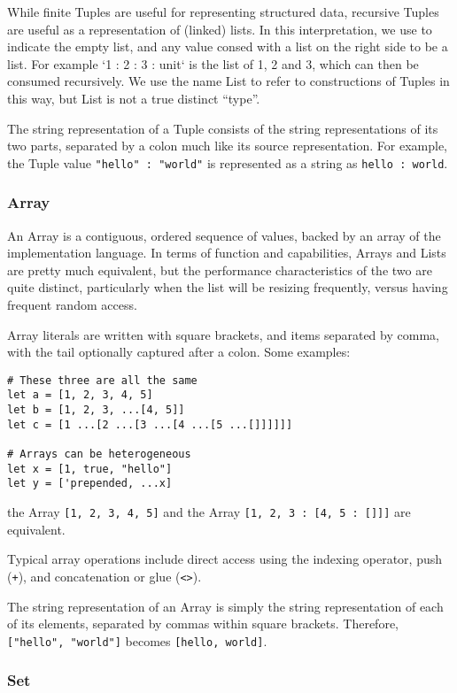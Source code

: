 While finite Tuples are useful for representing structured data, recursive Tuples
are useful as a representation of (linked) lists. In this interpretation, we use
 to indicate the empty list, and any value consed with a list on the
right side to be a list. For example `1 : 2 : 3 : unit` is the list of 1, 2 and 3,
which can then be consumed recursively. We use the name List to refer to constructions
of Tuples in this way, but List is not a true distinct ``type''.

The string representation of a Tuple consists of the string representations of its
two parts, separated by a colon much like its source representation.
For example, the Tuple value \texttt{"hello" : "world"} is represented as a string
as \texttt{hello : world}.

\subsubsection{Array}

An Array is a contiguous, ordered sequence of values, backed by an array of
the implementation language. In terms of function and capabilities, Arrays
and Lists are pretty much equivalent, but the performance characteristics
of the two are quite distinct, particularly when the list will be resizing
frequently, versus having frequent random access.

Array literals are written with square brackets, and items separated by
comma, with the tail optionally captured after a colon. Some examples:

\begin{lstlisting}[language=Trilogy]
# These three are all the same
let a = [1, 2, 3, 4, 5]
let b = [1, 2, 3, ...[4, 5]]
let c = [1 ...[2 ...[3 ...[4 ...[5 ...[]]]]]]

# Arrays can be heterogeneous
let x = [1, true, "hello"]
let y = ['prepended, ...x]
\end{lstlisting}
the Array \texttt{[1, 2, 3, 4, 5]} and the Array \texttt{[1, 2, 3 : [4, 5 : []]]}
are equivalent.

Typical array operations include direct access using the indexing operator,
push (\texttt{+}), and concatenation or glue (\texttt{<>}).

The string representation of an Array is simply the string representation of
each of its elements, separated by commas within square brackets. Therefore,
\texttt{["hello", "world"]} becomes \texttt{[hello, world]}.

\subsubsection{Set}

